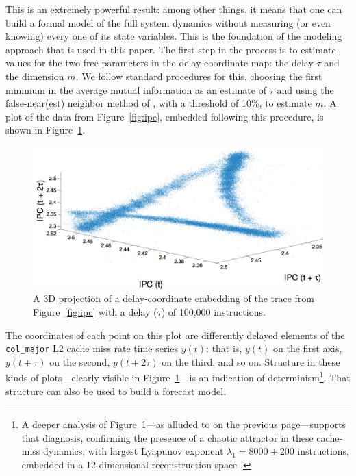 \documentclass{article}
\begin{document}
This is an extremely powerful result: among other things, it means
that one can build a formal model of the full system dynamics without
measuring (or even knowing) every one of its state variables.  This is
the foundation of the modeling approach that is used in this paper.
The first step in the process is to estimate values for the two free
parameters in the delay-coordinate map: the delay $\tau$ and the
dimension $m$.  We follow standard procedures for this, choosing the
first minimum in the average mutual information as an estimate of
$\tau$ \cite{fraser-swinney} and using the false-near(est) neighbor
method of \cite{KBA92}, with a threshold of 10\%, to estimate $m$.  A
plot of the data from Figure~\ref{fig:ipc}, embedded following this
procedure, is shown in Figure~\ref{fig:embedding}.


 \begin{figure}
   \centering
     \includegraphics[width=\textwidth]{figs/colipc3d.png}
     \caption{A 3D projection of a delay-coordinate embedding of the trace
 from Figure~\ref{fig:ipc} with a delay ($\tau$) of 100,000 instructions.
 }
 \label{fig:embedding}
 \end{figure}


The coordinates of each point on this plot are differently delayed
elements of the \verb|col_major| L2 cache miss rate time series
$y(t)$: that is, $y(t)$ on the first axis, $y(t+\tau)$ on the second,
$y(t+2\tau)$ on the third, and so on.
Structure in these kinds of plots---clearly visible in
Figure~\ref{fig:embedding}---is an indication of
determinism\footnote{A deeper analysis of
  Figure~\ref{fig:embedding}---as alluded to on the previous
  page---supports that diagnosis, confirming the presence of a chaotic
  attractor in these cache-miss dynamics, with largest Lyapunov
  exponent $\lambda_1 = 8000 \pm 200$ instructions, embedded in a
  12-dimensional reconstruction space \cite{mytkowicz09}.}.  That
structure can also be used to build a forecast model.
\end{document}
